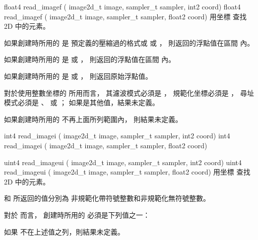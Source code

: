 
float4 read_imagef (
	image2d_t image,
	sampler_t sampler,
	int2 coord)
float4 read_imagef (
	image2d_t image,
	sampler_t sampler,
	float2 coord)
\stopbuffer
{}
用坐標  查找 2D   中的元素。

如果創建時所用的  是
預定義的壓縮過的格式或  或 ，
則返回的浮點值在區間 \math{[0.0 \cdots 1.0]} 內。

如果創建時所用的  是
  或 ，
則返回的浮點值在區間 \math{[-1.0 \cdots 1.0]} 內。

如果創建時所用的  是
  或 ，
則返回原始浮點值。

對於使用整數坐標的  所用而言，
其濾波模式必須是 ，
規範化坐標必須是 ，
尋址模式必須是 、 
 或 ；
如果是其他值，結果未定義。

如果創建時所用的  不再上面所列範圍內，
則結果未定義。
\stopbuffer

int4 read_imagei (
	image2d_t image,
	sampler_t sampler,
	int2 coord)
int4 read_imagei (
	image2d_t image,
	sampler_t sampler,
	float2 coord)

uint4 read_imageui (
	image2d_t image,
	sampler_t sampler,
	int2 coord)
uint4 read_imageui (
	image2d_t image,
	sampler_t sampler,
	float2 coord)
\stopbuffer
{}
用坐標  查找 2D   中的元素。

 和  所返回的值分別為
非規範化帶符號整數和非規範化無符號整數。

對於  而言，
創建時所用的  必須是下列值之一：
\startigBase[indentnext=no]
\item {}
\item {}
\item {}
\stopigBase
如果  不在上述值之列，則結果未定義。

